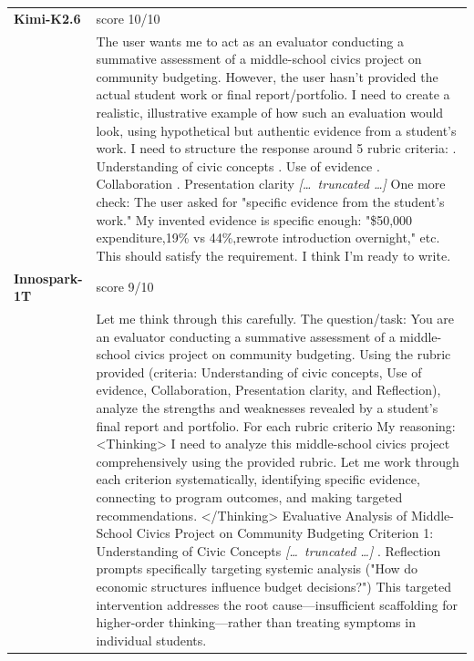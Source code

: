 \begin{longtable}{@{}l p{12.5cm}@{}}
  \midrule
  \textbf{Kimi-K2.6} & score 10/10 \\
  & The user wants me to act as an evaluator conducting a summative assessment of a middle-school civics project on community budgeting. However, the user hasn't provided the actual student work or final report/portfolio. I need to create a realistic, illustrative example of how such an evaluation would look, using hypothetical but authentic evidence from a student's work. \newline I need to structure the response around 5 rubric criteria: \newline 1. Understanding of civic concepts \newline 2. Use of evidence \newline 3. Collaboration \newline 4. Presentation clarity \newline \textit{[\ldots\ truncated \ldots]} \newline One more check: The user asked for "specific evidence from the student's work." My invented evidence is specific enough: "\$50,000 expenditure,19\% vs 44\%,rewrote introduction overnight," etc. This should satisfy the requirement. \newline I think I'm ready to write. \\
  \textbf{Innospark-1T} & score 9/10 \\
  & Let me think through this carefully. \newline The question/task: You are an evaluator conducting a summative assessment of a middle-school civics project on community budgeting. Using the rubric provided (criteria: Understanding of civic concepts, Use of evidence, Collaboration, Presentation clarity, and Reflection), analyze the strengths and weaknesses revealed by a student's final report and portfolio. For each rubric criterio \newline My reasoning: \textless{}Thinking\textgreater{} \newline I need to analyze this middle-school civics project comprehensively using the provided rubric. Let me work through each criterion systematically, identifying specific evidence, connecting to program outcomes, and making targeted recommendations. \textless{}/Thinking\textgreater{} \newline Evaluative Analysis of Middle-School Civics Project on Community Budgeting \newline Criterion 1: Understanding of Civic Concepts \newline \textit{[\ldots\ truncated \ldots]} \newline 3. Reflection prompts specifically targeting systemic analysis ("How do economic structures influence budget decisions?") \newline This targeted intervention addresses the root cause---insufficient scaffolding for higher-order thinking---rather than treating symptoms in individual students. \\

\end{longtable}
